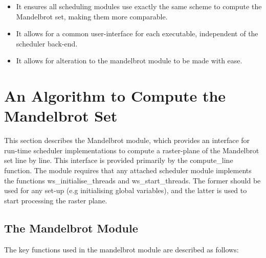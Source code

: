 \begin{itemize}
\item It ensures all scheduling modules use exactly the same scheme to compute the Mandelbrot set, making them more comparable.
\item It allows for a common user-interface for each executable, independent of the scheduler back-end.
\item It allows for alteration to the mandelbrot module to be made with ease.
\end{itemize}



\section{An Algorithm to Compute the Mandelbrot Set}
\label{sec:mandmod}

This section describes the Mandelbrot module, which provides an interface for run-time scheduler implementations to 
compute a raster-plane of the Mandelbrot set line by line. 
This interface is provided primarily by the compute\_line function. 
The module requires that any attached scheduler module implements the functions
ws\_initialise\_threads and ws\_start\_threads. 
The former should be used for any set-up (e.g initialising global variables),
and the latter is used to start processing the raster plane.

\subsection{The Mandelbrot Module}

The key functions used in the mandelbrot module are described as follows:

